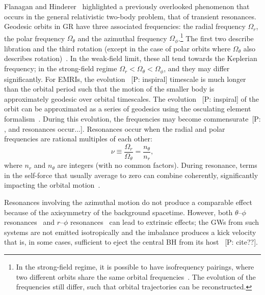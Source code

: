 \documentclass[aps,prd,amsfonts,amssymb,amsmath,nofootinbib,showpacs,superscriptaddress,twocolumn,floatfix]{revtex4-1}
\newcommand{\pcm}[1]{{\color{blue}~\textsf{[P: #1]}}}
\begin{document}
Flanagan and Hinderer~\cite{Flanagan2012} highlighted a previously overlooked phenomenon that occurs in the general relativistic two-body problem, that of transient resonances. Geodesic orbits in GR have three associated frequencies: the radial frequency $\Omega_r$, the polar frequency $\Omega_\theta$ and the azimuthal frequency $\Omega_\phi$.\footnote{In the strong-field regime, it is possible to have isofrequency pairings, where two different orbits share the same orbital frequencies~\cite{Warburton2013}. The evolution of the frequencies still differ, such that orbital trajectories can be reconstructed.} The first two describe libration and the third rotation (except in the case of polar orbits where $\Omega_\theta$ also describes rotation)~\cite{Goldstein2002}. %
In the weak-field limit, these all tend towards the Keplerian frequency; in the strong-field regime $\Omega_r < \Omega_\theta < \Omega_\phi$, and they may differ significantly. For EMRIs, the evolution \pcm{inspiral} timescale is much longer than the orbital period such that the motion of the smaller body is approximately geodesic over orbital timescales. The evolution  \pcm{inspiral}  of the orbit can be approximated as a series of geodesics using the osculating element formalism~\cite{Pound2008,Gair2011a}. During this evolution, the frequencies may become commensurate\pcm{, and resonances occur...}. Resonances occur when the radial and polar frequencies are rational multiples of each other:
\begin{equation}
\nu \equiv \frac{\Omega_r}{\Omega_\theta} = \frac{n_\theta}{n_r},
\end{equation}
where $n_r$ and $n_\theta$ are integers (with no common factors). During resonance, terms in the self-force that usually average to zero can combine coherently, significantly impacting the orbital motion~\cite{Flanagan2012a}.

Resonances involving the azimuthal motion do not produce a comparable effect because of the axisymmetry of the background spacetime. However, both $\theta$--$\phi$ resonances~\cite{Hirata2011} and $r$--$\phi$ resonances~\cite{VanDeMeent2013} can lead to extrinsic effects; the GWs from such systems are not emitted isotropically and the imbalance produces a kick velocity that is, in some cases, sufficient to eject the central BH from its host \pcm{cite??}.
\end{document}
